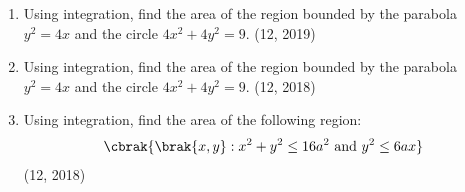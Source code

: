 \begin{enumerate}[label=\thesubsection.\arabic*,ref=\thesubsection.\theenumi]
%
\item Using integration, find the area of the region bounded by the parabola $y^{2}=4x$ and the circle $4x^{2}+4y^{2}=9$. \hfill (12, 2019)
\item Using integration, find the area of the region bounded by the parabola $y^{2}=4x$ and the circle $4x^{2}+4y^{2}=9$. \hfill (12, 2018)
\item Using integration, find the area of the following region:
  \begin{align*}
  \cbrak{\brak{x,y}:x^{2}+y^{2}\leq 16a^{2} ~\text{and}~ y^{2}\leq 6ax}
  \end{align*}
  \hfill (12, 2018)
\end{enumerate}
